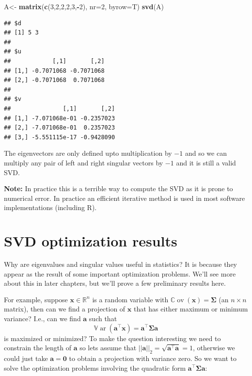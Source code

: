 \documentclass[]{book}
\newenvironment{Shaded}{\begin{snugshade}}{\end{snugshade}}
\newcommand{\DataTypeTok}[1]{\textcolor[rgb]{0.13,0.29,0.53}{#1}}
\newcommand{\DecValTok}[1]{\textcolor[rgb]{0.00,0.00,0.81}{#1}}
\newcommand{\KeywordTok}[1]{\textcolor[rgb]{0.13,0.29,0.53}{\textbf{#1}}}
\newcommand{\NormalTok}[1]{#1}
\newcommand{\OperatorTok}[1]{\textcolor[rgb]{0.81,0.36,0.00}{\textbf{#1}}}
\newcommand{\StringTok}[1]{\textcolor[rgb]{0.31,0.60,0.02}{#1}}
\theoremstyle{definition}
\theoremstyle{definition}
\theoremstyle{definition}
\theoremstyle{remark}
\begin{document}
\begin{Shaded}
\begin{Highlighting}[]
\NormalTok{A<-}\StringTok{ }\KeywordTok{matrix}\NormalTok{(}\KeywordTok{c}\NormalTok{(}\DecValTok{3}\NormalTok{,}\DecValTok{2}\NormalTok{,}\DecValTok{2}\NormalTok{,}\DecValTok{2}\NormalTok{,}\DecValTok{3}\NormalTok{,}\OperatorTok{-}\DecValTok{2}\NormalTok{), }\DataTypeTok{nr=}\DecValTok{2}\NormalTok{, }\DataTypeTok{byrow=}\NormalTok{T)}
\KeywordTok{svd}\NormalTok{(A)}
\end{Highlighting}
\end{Shaded}

\begin{verbatim}
## $d
## [1] 5 3
## 
## $u
##            [,1]       [,2]
## [1,] -0.7071068 -0.7071068
## [2,] -0.7071068  0.7071068
## 
## $v
##               [,1]       [,2]
## [1,] -7.071068e-01 -0.2357023
## [2,] -7.071068e-01  0.2357023
## [3,] -5.551115e-17 -0.9428090
\end{verbatim}

The eigenvectors are only defined upto multiplication by \(-1\) and so we can multiply any pair of left and right singular vectors by \(-1\) and it is still a valid SVD.

\textbf{Note:} In practice this is a terrible way to compute the SVD as it is prone to numerical error. In practice an efficient iterative method is used in most software implementations (including R).

\hypertarget{svdopt}{%
\section{SVD optimization results}\label{svdopt}}

Why are eigenvalues and singular values useful in statistics? It is because they appear as the result of some important optimization problems. We'll see more about this in later chapters, but we'll prove a few preliminary results here.

For example, suppose \(\mathbf x\in\mathbb{R}^n\) is a random variable with \({\mathbb{C}\operatorname{ov}}(\mathbf x)=\boldsymbol{\Sigma}\) (an \(n \times n\) matrix), then can we find a projection of \(\mathbf x\) that has either maximum or minimum variance? I.e., can we find \(\mathbf a\) such that \[{\mathbb{V}\operatorname{ar}}(\mathbf a^\top\mathbf x)=\mathbf a^\top \boldsymbol{\Sigma}\mathbf a\] is maximized or minimized?
To make the question interesting we need to constrain the length of \(\mathbf a\) so lets assume that \(||\mathbf a||_2 = \sqrt{\mathbf a^\top \mathbf a}=1\), otherwise we could just take \(\mathbf a=\boldsymbol 0\) to obtain a projection with variance zero. So we want to solve the optimization problems involving the quadratic form \(\mathbf a^\top \boldsymbol{\Sigma}\mathbf a\):
\end{document}
